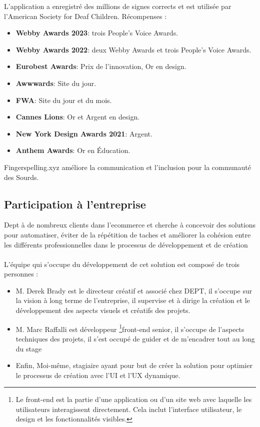 L'application a enregistré des millions de signes corrects et est utilisée par l'American Society for Deaf Children. Récompenses :
\begin{itemize}
    \item \textbf{Webby Awards 2023}: trois People's Voice Awards. 
    \item \textbf{Webby Awards 2022}: deux Webby Awards et trois People's Voice Awards.
    \item \textbf{Eurobest Awards}: Prix de l'innovation, Or en design.
    \item \textbf{Awwwards}: Site du jour.
    \item \textbf{FWA}: Site du jour et du mois.
    \item \textbf{Cannes Lions}: Or et Argent en design.
    \item \textbf{New York Design Awards 2021}: Argent.
    \item \textbf{Anthem Awards}: Or en Éducation.
\end{itemize}

Fingerspelling.xyz améliore la communication et l'inclusion pour la communauté des Sourds.

\subsection{Participation à l'entreprise}

Dept à de nombreux clients dans l'ecommerce et cherche à concevoir des solutions pour automatiser, éviter de la répétition de taches et améliorer la cohésion entre les différents professionnelles dans le processus de développement et de création
\\ \\
L’équipe qui s’occupe du développement de cet solution est composé de trois personnes : 
\begin{itemize}
    \item M. Derek Brady est le directeur créatif et associé chez DEPT, il s'occupe sur la vision à long terme de l'entreprise, il supervise et à dirige la création et le développement des aspects visuels et créatifs des projets.
    \item M. Marc Raffalli est développeur \footnote{Le front-end est la partie d'une application ou d'un site web avec laquelle les utilisateurs interagissent directement. Cela inclut l'interface utilisateur, le design et les fonctionnalités visibles.}front-end senior, il s'occupe de l'aspects techniques des projets, il s'est occupé de guider et de m'encadrer tout au long du stage
    \item Enfin, Moi-même, stagiaire ayant pour but de créer la solution pour optimier le processus de création avec l'UI et l'UX dynamique.
\end{itemize}

